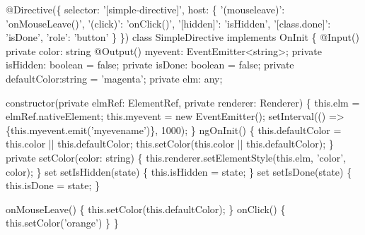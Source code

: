 \documentclass[12pt,]{article}
\newenvironment{Shaded}{}{}
\newcommand{\KeywordTok}[1]{\textcolor[rgb]{0.00,0.00,1.00}{{#1}}}
\newcommand{\DataTypeTok}[1]{{#1}}
\newcommand{\DecValTok}[1]{{#1}}
\newcommand{\FunctionTok}[1]{{#1}}
\newcommand{\NormalTok}[1]{{#1}}
\begin{document}
\begin{Shaded}
\begin{Highlighting}[numbers=left,,]
\FunctionTok{@Directive}\NormalTok{(\{}
  \NormalTok{selector: '[simple-directive]',}
  \NormalTok{host: \{}
    \NormalTok{'(mouseleave)': '}\FunctionTok{onMouseLeave}\NormalTok{()',}
    \NormalTok{'(click)': '}\FunctionTok{onClick}\NormalTok{()',}
    \NormalTok{'[hidden]': 'isHidden',}
    \NormalTok{'[}\KeywordTok{class}\NormalTok{.}\FunctionTok{done}\NormalTok{]': 'isDone',}
    \NormalTok{'role': 'button'}
  \NormalTok{\}}
\NormalTok{\})}
\KeywordTok{class} \NormalTok{SimpleDirective }\KeywordTok{implements} \NormalTok{OnInit \{}
  \FunctionTok{@Input}\NormalTok{() }\KeywordTok{private} \NormalTok{color: string}
  \FunctionTok{@Output}\NormalTok{() myevent: EventEmitter<string>;}
  \KeywordTok{private} \NormalTok{isHidden: }\DataTypeTok{boolean} \NormalTok{= }\KeywordTok{false}\NormalTok{;}
  \KeywordTok{private} \NormalTok{isDone: }\DataTypeTok{boolean} \NormalTok{= }\KeywordTok{false}\NormalTok{;}
  \KeywordTok{private} \NormalTok{defaultColor:string = 'magenta';}
  \KeywordTok{private} \NormalTok{elm: any;}

  \FunctionTok{constructor}\NormalTok{(}\KeywordTok{private} \NormalTok{elmRef: ElementRef, }\KeywordTok{private} \NormalTok{renderer: Renderer) \{}
    \KeywordTok{this}\NormalTok{.}\FunctionTok{elm} \NormalTok{= elmRef.}\FunctionTok{nativeElement}\NormalTok{;}
    \KeywordTok{this}\NormalTok{.}\FunctionTok{myevent} \NormalTok{= }\KeywordTok{new} \FunctionTok{EventEmitter}\NormalTok{();}
    \FunctionTok{setInterval}\NormalTok{(() => \{}\KeywordTok{this}\NormalTok{.}\FunctionTok{myevent}\NormalTok{.}\FunctionTok{emit}\NormalTok{('myevename')\}, }\DecValTok{1000}\NormalTok{);}
  \NormalTok{\}}
  \FunctionTok{ngOnInit}\NormalTok{() \{}
    \KeywordTok{this}\NormalTok{.}\FunctionTok{defaultColor} \NormalTok{= }\KeywordTok{this}\NormalTok{.}\FunctionTok{color} \NormalTok{|| }\KeywordTok{this}\NormalTok{.}\FunctionTok{defaultColor}\NormalTok{;}
    \KeywordTok{this}\NormalTok{.}\FunctionTok{setColor}\NormalTok{(}\KeywordTok{this}\NormalTok{.}\FunctionTok{color} \NormalTok{|| }\KeywordTok{this}\NormalTok{.}\FunctionTok{defaultColor}\NormalTok{);}
  \NormalTok{\}}
  \KeywordTok{private} \FunctionTok{setColor}\NormalTok{(color: string) \{}
    \KeywordTok{this}\NormalTok{.}\FunctionTok{renderer}\NormalTok{.}\FunctionTok{setElementStyle}\NormalTok{(}\KeywordTok{this}\NormalTok{.}\FunctionTok{elm}\NormalTok{, 'color', color);}
  \NormalTok{\}}
  \NormalTok{set }\FunctionTok{setIsHidden}\NormalTok{(state) \{ }\KeywordTok{this}\NormalTok{.}\FunctionTok{isHidden} \NormalTok{= state; \}}
  \NormalTok{set }\FunctionTok{setIsDone}\NormalTok{(state) \{ }\KeywordTok{this}\NormalTok{.}\FunctionTok{isDone} \NormalTok{= state; \}}

  \FunctionTok{onMouseLeave}\NormalTok{() \{ }\KeywordTok{this}\NormalTok{.}\FunctionTok{setColor}\NormalTok{(}\KeywordTok{this}\NormalTok{.}\FunctionTok{defaultColor}\NormalTok{); \}}
  \FunctionTok{onClick}\NormalTok{() \{ }\KeywordTok{this}\NormalTok{.}\FunctionTok{setColor}\NormalTok{('orange') \}}
\NormalTok{\}}
\end{Highlighting}
\end{Shaded}
\end{document}
